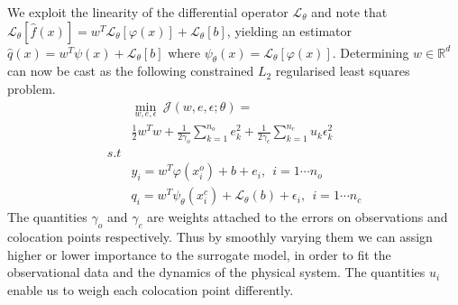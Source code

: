 We exploit the linearity of the differential operator $\mathcal{L}_{\theta}$ and note that 
$\mathcal{L}_{\theta} [\hat{f}(x)] = w^{T} \mathcal{L}_{\theta}[\varphi(x)] + \mathcal{L}_{\theta}[b]$, 
yielding an estimator 
$\hat{q}(x) = w^{T}\psi(x) + \mathcal{L}_{\theta}[b]$ where $\psi_{\theta}(x) = \mathcal{L}_{\theta}[\varphi(x)]$. 
Determining $w \in \mathbb{R}^d$ can now be cast as the following constrained $L_2$ regularised 
least squares problem.
%
\begin{equation}\label{eq:surrogate}
   \begin{aligned}
    & \min_{w,e,\epsilon} \ \mathcal{J}(w,e,\epsilon;\theta) = \\
    & \frac{1}{2} w^{T}w + \frac{1}{2\gamma_{o}} \sum_{k = 1}^{n_{o}}{e^{2}_{k}} + 
      \frac{1}{2\gamma_{c}} \sum_{k = 1}^{n_{c}}{u_{k} \epsilon^{2}_{k}} \\
    s.t & \\
    & y_{i}  = w^{T}\varphi(x^{o}_{i}) + b + e_{i}, \ \ i = 1 \cdots n_{o} \\
    & q_{i} = w^{T}\psi_{\theta}(x^{c}_{i}) + \mathcal{L}_{\theta}(b) + \epsilon_{i}, \ \ i = 1 \cdots n_{c}
   \end{aligned}
\end{equation}
%
The quantities $\gamma_{o}$ and $\gamma_{c}$ are weights attached to the errors on observations and 
colocation points respectively. Thus by smoothly varying them we can assign higher or lower 
importance to the surrogate model, in order to fit the observational data and the dynamics of the 
physical system. The quantities $u_i$ enable us to weigh each colocation point differently. 

